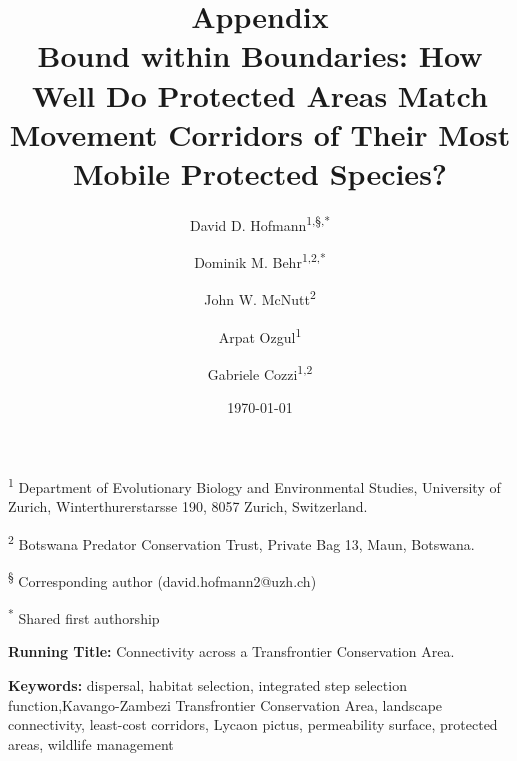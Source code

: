 \documentclass[abstract=off,10pt,a4paper,bibliography=totocnumbered]{article}
\title{\textbf{Appendix}\\ Bound within Boundaries: How Well Do Protected Areas
Match Movement Corridors of Their Most Mobile Protected Species?}
\author{
  David D. Hofmann\textsuperscript{1,\S,*} \and
  Dominik M. Behr\textsuperscript{1,2,*} \and
  John W. McNutt\textsuperscript{2} \and
  Arpat Ozgul\textsuperscript{1} \and
  Gabriele Cozzi\textsuperscript{1,2}
}
\date{\today}
\newcommand{\beginappendix}{%
  \setcounter{table}{0}
  \renewcommand{\thetable}{S\arabic{table}}%
  \setcounter{figure}{0}
  \renewcommand{\thefigure}{S\arabic{figure}}%
  \setcounter{equation}{0}
  \renewcommand{\theequation}{Equation S\arabic{equation}}%
  \setcounter{section}{0}
  \renewcommand{\thesection}{A.\arabic{section}}%
}
\begin{document}



\maketitle

\begin{flushleft}

\vspace{0.5cm}

\textsuperscript{1} Department of Evolutionary Biology and Environmental
Studies, University of Zurich, Winterthurerstarsse 190, 8057 Zurich,
Switzerland.

\textsuperscript{2} Botswana Predator Conservation Trust, Private Bag 13, Maun,
Botswana.

\textsuperscript{\S} Corresponding author (david.hofmann2@uzh.ch)

\textsuperscript{*} Shared first authorship

\vspace{4cm}

\textbf{Running Title:} Connectivity across a Transfrontier Conservation Area.

\vspace{0.5cm}

\textbf{Keywords:} dispersal, habitat selection, integrated step selection
function,Kavango-Zambezi Transfrontier Conservation Area, landscape
connectivity, least-cost corridors, Lycaon pictus, permeability surface,
protected areas, wildlife management

\end{flushleft}

\newpage


\linenumbers

\appendix
\beginappendix

\end{document}
